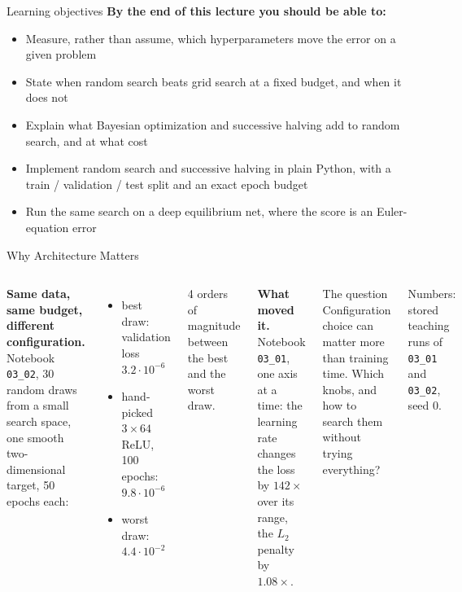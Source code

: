 \documentclass[aspectratio=169,11pt]{beamer}
\newcommand{\emphc}[1]{\textcolor{harvardcrimson}{#1}}
\begin{document}
\begin{frame}{Learning objectives}
\textbf{By the end of this lecture you should be able to:}
\begin{itemize}
  \item Measure, rather than assume, which hyperparameters move the error on a given problem
  \item State when random search beats grid search at a fixed budget, and when it does not
  \item Explain what Bayesian optimization and successive halving add to random search, and at what cost
  \item Implement random search and successive halving in plain Python, with a train / validation / test split and an exact epoch budget
  \item Run the same search on a deep equilibrium net, where the score is an Euler-equation error
\end{itemize}
\end{frame}



\begin{frame}{Why Architecture Matters}
\begin{columns}[T]
\small
\textbf{Same data, same budget, different configuration.}
Notebook \texttt{03\_02}, 30 random draws from a small search space, one smooth
two-dimensional target, 50 epochs each:
\begin{itemize}\itemsep1pt
    \item best draw: validation loss $3.2\cdot10^{-6}$
    \item hand-picked $3\times64$ ReLU, 100 epochs: $9.8\cdot10^{-6}$
    \item worst draw: $4.4\cdot10^{-2}$
\end{itemize}
4 orders of magnitude between the best and the worst draw.

\vspace{0.15cm}
\textbf{What moved it.} Notebook \texttt{03\_01}, one axis at a time: the learning rate changes
the loss by \emphc{$142\times$} over its range, the $L_2$ penalty by $1.08\times$.

\begin{block}{The question}
Configuration choice can matter more than training time. Which knobs, and how to search them
without trying everything?
\end{block}
\vspace{0.2cm}
{\scriptsize Numbers: stored teaching runs of \texttt{03\_01} and \texttt{03\_02}, seed 0.}
\end{columns}
\end{frame}
\end{document}

